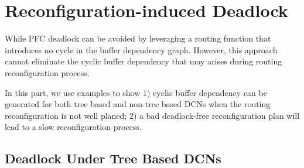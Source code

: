 \section{Reconfiguration-induced Deadlock}\label{sec:reconfigdeadlock}



While PFC deadlock can be avoided by leveraging a routing function that introduces no cycle in the buffer dependency graph. However, this approach cannot eliminate the cyclic buffer dependency that may arises during routing reconfiguration process.

In this part, we use examples to show 1) cyclic buffer dependency can be generated for both tree based and non-tree based DCNs when the routing reconfiguration is not well planed; 2) a bad deadlock-free reconfiguration plan will lead to a slow reconfiguration process.

\subsection{Deadlock Under Tree Based DCNs}\label{subsec:treecase}

